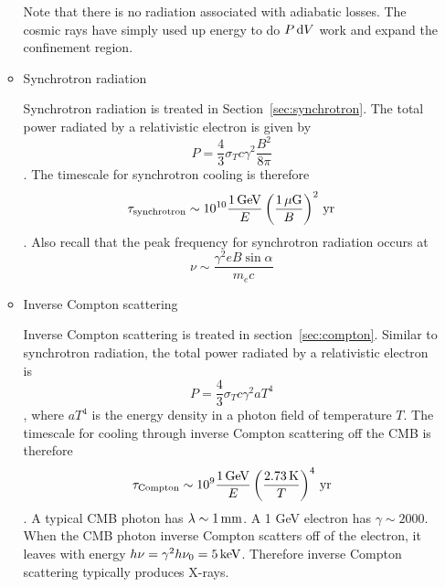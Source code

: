 \begin{enumerate}
\begin{itemize}
            Note that there is no radiation associated with adiabatic losses.  The cosmic rays
            have simply used up energy to do $P\,{\rm d} V$ work and expand the confinement region.

      \item Synchrotron radiation

            Synchrotron radiation is treated in Section~\ref{sec:synchrotron}.  The total
            power radiated by a relativistic electron is given by
            \begin{dmath}
                P = \frac43\sigma_Tc\gamma^2\frac{B^2}{8\pi}
            \end{dmath}.
            The timescale for synchrotron cooling is therefore
            \begin{dmath}
                \tau_{\rm synchrotron} \sim 10^{10}\frac{1\,{\rm GeV}}{E}\left(\frac{1\,\mu{\rm G}}{B}\right)^2\,{\rm yr}
            \end{dmath}.
            Also recall that the peak frequency for synchrotron radiation occurs at
            \begin{dmath}
                \nu \sim \frac{\gamma^2eB\sin\alpha}{m_e c}
            \end{dmath}

      \item Inverse Compton scattering

            Inverse Compton scattering is treated in section~\ref{sec:compton}.  Similar to
            synchrotron radiation, the total power radiated by a relativistic electron is
            \begin{dmath}
                P = \frac43\sigma_Tc\gamma^2aT^4
            \end{dmath},
            where $aT^4$ is the energy density in a photon field of temperature $T$.
            The timescale for cooling through inverse Compton scattering off the CMB is therefore
            \begin{dmath}
                \tau_{\rm Compton} \sim 10^9\frac{1\,{\rm GeV}}{E}\left(\frac{2.73\,{\rm K}}{T}\right)^4\,{\rm yr}
            \end{dmath}.
            A typical CMB photon has $\lambda\sim 1\,{\rm mm}$.
            A 1 GeV electron has $\gamma\sim 2000$.  When the CMB photon inverse Compton scatters
            off of the electron, it leaves with energy $h\nu = \gamma^2 h\nu_0 = 5\,{\rm keV}$.
            Therefore inverse Compton scattering typically produces X-rays.


\end{itemize}
\end{enumerate}
